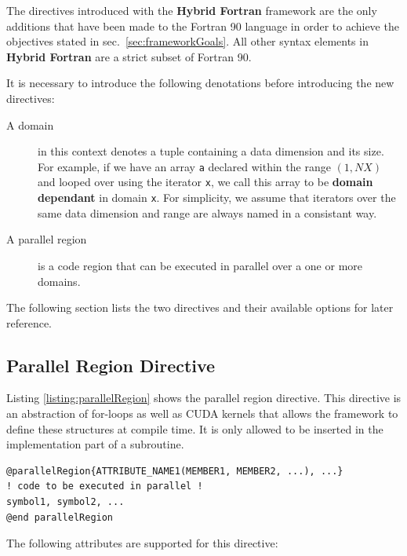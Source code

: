 The directives introduced with the \textbf{Hybrid Fortran} framework are the only additions that have been made to the Fortran 90 language in order to achieve the objectives stated in sec.~\ref{sec:frameworkGoals}. All other syntax elements in \textbf{Hybrid Fortran} are a strict subset of Fortran 90.

It is necessary to introduce the following denotations before introducing the new directives:

\begin{description}
 \item [A domain] in this context denotes a tuple containing a data dimension and its size. For example, if we have an array \verb|a| declared within the range $(1,\unit{NX})$ and looped over using the iterator \verb|x|, we call this array to be \textbf{domain dependant} in domain \verb|x|. For simplicity, we assume that iterators over the same data dimension and range are always named in a consistant way.
 \item [A parallel region] is a code region that can be executed in parallel over a one or more domains.
\end{description}

The following section lists the two directives and their available options for later reference.

\subsection{Parallel Region Directive} \label{sub:parallelRegionDirective}

Listing \ref{listing:parallelRegion} shows the parallel region directive. This directive is an abstraction of for-loops as well as CUDA kernels that allows the framework to define these structures at compile time. It is only allowed to be inserted in the implementation part of a subroutine.

\begin{lstlisting}[name=parallelRegion, label=listing:parallelRegion, caption={Parallel region directive syntax.}]
@parallelRegion{ATTRIBUTE_NAME1(MEMBER1, MEMBER2, ...), ...}
! code to be executed in parallel !
symbol1, symbol2, ...
@end parallelRegion
\end{lstlisting}

The following attributes are supported for this directive:

